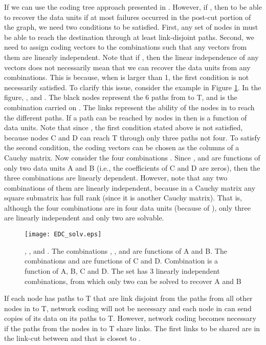 \documentclass[conference]{IEEEtran}
\begin{document}
If  we can use the coding tree approach presented in \cite{OA09}. However, if , then to be able to recover the  data units if at most  failures occurred in the post-cut portion of the graph, we need two conditions to be satisfied. First, any set of  nodes in  must be able to reach the destination through at least  link-disjoint paths. Second, we need to assign coding vectors to the  combinations such that any  vectors from them are linearly independent. Note that if , then the linear independence of any  vectors does not necessarily mean that we can recover the  data units from any  combinations. This is because, when  is larger than 1, the first condition is not necessarily satisfied. To clarify this issue, consider the example in Figure \ref{Fig:EDC_solv}. In the figure, ,  and . The black nodes represent the 6 paths from  to T, and  is the combination carried on . The links represent the ability of the nodes in  to reach the different paths. If a path  can be reached by  nodes in  then  is a function of  data units. Note that since , the first condition stated above is not satisfied, because nodes C and D can reach T through only three paths not four. To satisfy the second condition, the coding vectors can be chosen as the columns of a  Cauchy matrix. Now consider the four combinations . Since ,  and  are functions of only two data units A and B (i.e., the coefficients of C and D are zeros), then the three combinations are linearly dependent. However, note that any two combinations of them are linearly independent, because in a Cauchy matrix any square submatrix has full rank (since it is another Cauchy matrix). That is, although the four combinations are in four data units (because of ), only three are linearly independent and only two are solvable.

\begin{figure}[tbh]
\centering
\texttt{[image: EDC\_solv.eps]}
\caption{, , and . The combinations , , and  are functions of A and B. The combinations  and  are functions of C and D. Combination  is a function of A, B, C and D. The set  has 3 linearly independent combinations, from which only two can be solved to recover A and B}
\label{Fig:EDC_solv}
\end{figure}




If each node  has  paths to T that are link disjoint from the paths from all other nodes in  to T, network coding will not be necessary and each node in  can send  copies of its data on its  paths to T. However, network coding becomes necessary if the paths from the nodes in  to T share links. The first links to be shared are in the link-cut between  and  that is closest to . 
\end{document}
